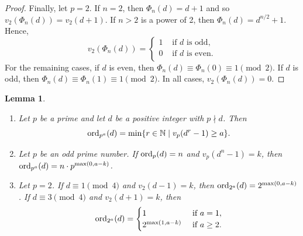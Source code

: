 \documentclass[10pt,leqno]{amsart}
\newtheorem{lemma}[theorem]{Lemma}
\theoremstyle{definition}
\theoremstyle{remark}
\numberwithin{equation}{section}
\def\nn{\mathbb{N}}
\def\ord{{\rm ord}}
\begin{document}
\begin{proof}
    Finally, let $p = 2$. If $n = 2$, then $\Phi_n(d) = d+1$ and so $v_2(\Phi_n(d)) = v_2(d+1)$. If $n>2$ is a power of 2, then $\Phi_n(d) = d^{n/2}+1$. Hence,
    $$v_2(\Phi_n(d)) = \begin{cases}
        1&\text{ if }d\text{ is odd},\\
        0&\text{ if }d\text{ is even}.\\
    \end{cases}$$
    For the remaining cases, if $d$ is even, then $\Phi_n(d)\equiv \Phi_n(0)\equiv 1\pmod 2$. If $d$ is odd, then $\Phi_n(d)\equiv \Phi_n(1)\equiv 1\pmod 2$. In all cases, $v_2(\Phi_n(d)) = 0$.
\end{proof}
\vspace{1em}
\begin{lemma}~
    \begin{enumerate}
        \item Let $p$ be a prime and let $d$ be a positive integer with $p\nmid d$. Then
        $$\ord_{p^a}(d) = \min\{r\in\nn\mid v_p(d^r-1)\geq a\}.$$
        \item Let $p$ be an odd prime number. If $\ord_p(d) = n$ and $v_p(d^n-1) = k$, then $\ord_{p^a}(d) = n\cdot p^{\max(0,a-k)}$.
        \item Let $p = 2$. If $d\equiv 1\pmod 4$ and $v_2(d-1) = k$, then $\ord_{2^a}(d) = 2^{\max(0,a-k)}$.
        If $d\equiv 3\pmod 4$ and $v_2(d+1) = k$, then
        $$\ord_{2^a}(d) = \begin{cases}
            1 &\text{ if }a = 1,\\
            2^{\max(1,a-k)}&\text{ if }a\geq 2.
        \end{cases}$$
    \end{enumerate}
\end{lemma}
\end{document}
